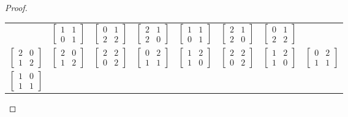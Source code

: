 \documentclass[12pt, psamsfonts]{amsart}
\theoremstyle{definition}
\theoremstyle{remark}
\numberwithin{equation}{section}
\begin{document}
\begin{proof}
\begin{enumerate}
\begin{center}
\begin{tabular}{|c|c|c|c|c|c|c|c|}
          & $\begin{bmatrix} 1 & 1 \\ 0 & 1 \end{bmatrix}$
          & $\begin{bmatrix} 0 & 1 \\ 2 & 2 \end{bmatrix}$
          & $\begin{bmatrix} 2 & 1 \\ 2 & 0 \end{bmatrix}$
          & $\begin{bmatrix} 1 & 1 \\ 0 & 1 \end{bmatrix}$
          & $\begin{bmatrix} 2 & 1 \\ 2 & 0 \end{bmatrix}$
          & $\begin{bmatrix} 0 & 1 \\ 2 & 2 \end{bmatrix}$ \\
          $\begin{bmatrix} 2 & 0 \\ 1 & 2 \end{bmatrix}$
          & $\begin{bmatrix} 2 & 0 \\ 1 & 2 \end{bmatrix}$
          & $\begin{bmatrix} 2 & 2 \\ 0 & 2 \end{bmatrix}$
          & $\begin{bmatrix} 0 & 2 \\ 1 & 1 \end{bmatrix}$
          & $\begin{bmatrix} 1 & 2 \\ 1 & 0 \end{bmatrix}$
          & $\begin{bmatrix} 2 & 2 \\ 0 & 2 \end{bmatrix}$
          & $\begin{bmatrix} 1 & 2 \\ 1 & 0 \end{bmatrix}$
          & $\begin{bmatrix} 0 & 2 \\ 1 & 1 \end{bmatrix}$ \\
          $\begin{bmatrix} 1 & 0 \\ 1 & 1 \end{bmatrix}$

\end{tabular}
\end{center}
\end{enumerate}
\end{proof}
\end{document}
